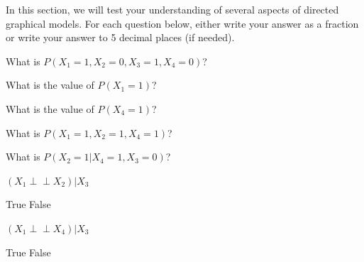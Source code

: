 \documentclass[11pt,addpoints,answers]{exam}
\newcommand{\independent}{\perp\!\!\!\perp  }
\begin{document}
\begin{questions}
In this section, we will test your understanding of several aspects of directed graphical models. For each question below, either write your answer as a fraction or write your answer to 5 decimal places (if needed).

\clearpage

\begin{questions}


\question[2]  What is $P(X_1=1, X_2=0, X_3=1, X_4=0)$?

\begin{your_solution}[title=Your Answer:,height=3cm,width=10cm]
\end{your_solution}

    
 
 
\question[2]  What is the value of $P(X_1=1)$?

\begin{your_solution}[title=Your Answer:,height=3cm,width=10cm]
\end{your_solution}

    
 
 
\question[2] What is the value of  $P(X_4=1)$?

\begin{your_solution}[title=Your Answer:,height=3cm,width=10cm]
\end{your_solution}

    
 
\question[2] What is $P(X_1 = 1, X_2=1, X_4=1)$?

\begin{your_solution}[title=Your Answer:,height=3cm,width=10cm]
\end{your_solution}

    
 
 \question[2] What is $P(X_2=1|X_4=1,X_3=0)$?

\begin{your_solution}[title=Your Answer:,height=3cm,width=10cm]
\end{your_solution}

    
 
 \clearpage
 
 \question[3] $(X_1 \independent X_2) | X_3$

\begin{checkboxes}
    \choice True
    \choice False
\end{checkboxes}


    
 
 \question[3] $(X_1 \independent X_4) | X_3$

\begin{checkboxes}
    \choice True
    \choice False
\end{checkboxes}



\end{questions}
\end{questions}
\end{document}
